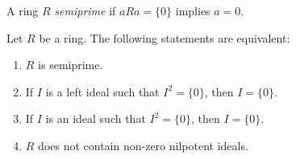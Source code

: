 




\begin{definition}
	A ring $R$ \emph{semiprime} if 
	$aRa=\{0\}$ implies $a=0$.
\end{definition}

\begin{proposition}
	Let $R$ be a ring. The following statements are equivalent: 
	\begin{enumerate}
		\item $R$ is semiprime.
		\item If $I$ is a left ideal such that $I^2=\{0\}$, then $I=\{0\}$.
		\item If $I$ is an ideal such that $I^2=\{0\}$, then $I=\{0\}$.
		\item $R$ does not contain non-zero nilpotent ideals.
	\end{enumerate}
\end{proposition}

